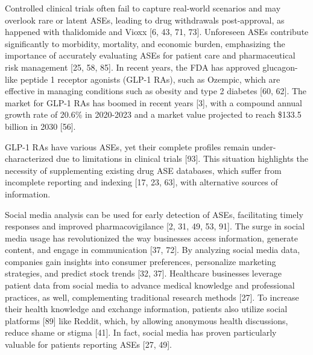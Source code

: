 \documentclass[referee,bst/sn-basic]{sn-jnl}%
\begin{document}
Controlled clinical trials often fail to capture real-world scenarios and may overlook rare or latent ASEs, leading to drug withdrawals post-approval, as happened with thalidomide and Vioxx [6, 43, 71, 73].
Unforeseen ASEs contribute significantly to morbidity, mortality, and economic burden, emphasizing the importance of accurately evaluating ASEs for patient care and pharmaceutical risk management [25, 58, 85]. 
In recent years, the FDA has approved glucagon-like peptide 1 receptor agonists (GLP-1 RAs), such as Ozempic, which are effective in managing conditions such as obesity and type 2 diabetes [60, 62].
The market for GLP-1 RAs has boomed in recent years [3], 
with a compound annual growth rate of 20.6\% in 2020-2023 and a market value projected to reach \$133.5 billion in 2030 [56].


GLP-1 RAs have various ASEs, yet their complete profiles remain under-characterized due to limitations in clinical trials [93]. 
This situation highlights the necessity of supplementing existing drug ASE databases, which suffer from incomplete reporting and indexing [17, 23, 63], 
with alternative sources of information. 

Social media analysis can be used for early detection of ASEs, facilitating timely responses and improved pharmacovigilance [2, 31, 49, 53, 91].
The surge in social media usage has revolutionized the way businesses access information, generate content, and engage in communication [37, 72]. 
By analyzing social media data, companies gain insights into consumer preferences, personalize marketing strategies, and  predict stock trends [32, 37]. 
Healthcare businesses leverage patient data from social media to advance medical knowledge and professional practices, as well, complementing traditional research methods [27]. 
To increase their health knowledge and exchange information, patients also utilize social platforms [89] 
like Reddit, which, by allowing anonymous health discussions, reduce shame or stigma [41]. 
In fact, social media has proven particularly valuable for patients reporting ASEs [27, 49]. 
\end{document}

